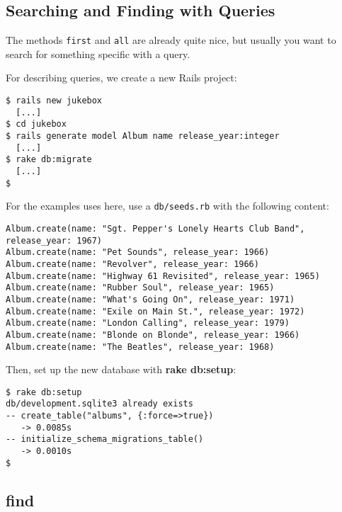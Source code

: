 \documentclass[a4paper]{book}
\newcounter{tab}[chapter]
\begin{document}
\subsection{Searching and Finding with Queries}\label{searching-and-finding-with-queries}

The methods \texttt{first} and \texttt{all} are already quite nice, but usually you want to search for something specific with a query.

For describing queries, we create a new Rails project:

\begin{shaded}\begin{verbatim}
$ rails new jukebox
  [...]
$ cd jukebox
$ rails generate model Album name release_year:integer
  [...]
$ rake db:migrate
  [...]
$
\end{verbatim}\end{shaded}

For the examples uses here, use a \texttt{db/seeds.rb} with the following content:

\begin{shaded}\begin{verbatim}
Album.create(name: "Sgt. Pepper's Lonely Hearts Club Band", release_year: 1967)
Album.create(name: "Pet Sounds", release_year: 1966)
Album.create(name: "Revolver", release_year: 1966)
Album.create(name: "Highway 61 Revisited", release_year: 1965)
Album.create(name: "Rubber Soul", release_year: 1965)
Album.create(name: "What's Going On", release_year: 1971)
Album.create(name: "Exile on Main St.", release_year: 1972)
Album.create(name: "London Calling", release_year: 1979)
Album.create(name: "Blonde on Blonde", release_year: 1966)
Album.create(name: "The Beatles", release_year: 1968)
\end{verbatim}\end{shaded}

Then, set up the new database with \textbf{rake db:setup}:

\begin{shaded}\begin{verbatim}
$ rake db:setup
db/development.sqlite3 already exists
-- create_table("albums", {:force=>true})
   -> 0.0085s
-- initialize_schema_migrations_table()
   -> 0.0010s
$
\end{verbatim}\end{shaded}

\subsection{find}\label{find}
\end{document}
